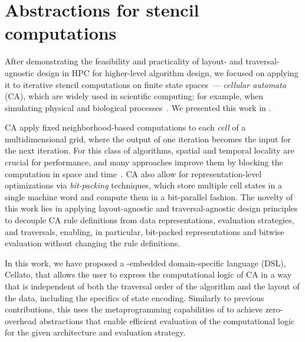 \section{Abstractions for stencil computations}\label{sec:stencil-computations}

After demonstrating the feasibility and practicality of layout- and traversal-agnostic design in HPC for higher-level algorithm design, we focused on applying it to iterative stencil computations on finite state spaces~--- \emph{cellular automata} (CA), which are widely used in scientific computing; for example, when simulating physical and biological processes~\cite{mohebbi2020implementation,babu2021modeling,valentim2023cellular}. We presented this work in .

CA apply fixed neighborhood-based computations to each \emph{cell} of a multidimensional grid, where the output of one iteration becomes the input for the next iteration. For this class of algorithms, spatial and temporal locality are crucial for performance, and many approaches improve them by blocking the computation in space and time~\cite{afanasyev2021gridtools,christen2011patus,matsumura2020an5d}. CA also allow for representation-level optimizations via \emph{bit-packing} techniques, which store multiple cell states in a single machine word and compute them in a bit-parallel fashion. The novelty of this work lies in applying layout-agnostic and traversal-agnostic design principles to decouple CA rule definitions from data representations, evaluation strategies, and traversals, enabling, in particular, bit-packed representations and bitwise evaluation without changing the rule definitions.

In this work, we have proposed a \cpp-embedded domain-specific language (DSL), Cellato, that allows the user to express the computational logic of CA in a way that is independent of both the traversal order of the algorithm and the layout of the data, including the specifics of state encoding. Similarly to previous contributions, this uses the metaprogramming capabilities of \cpp to achieve zero-overhead abstractions that enable
efficient evaluation of the computational logic for the given architecture and evaluation strategy.

